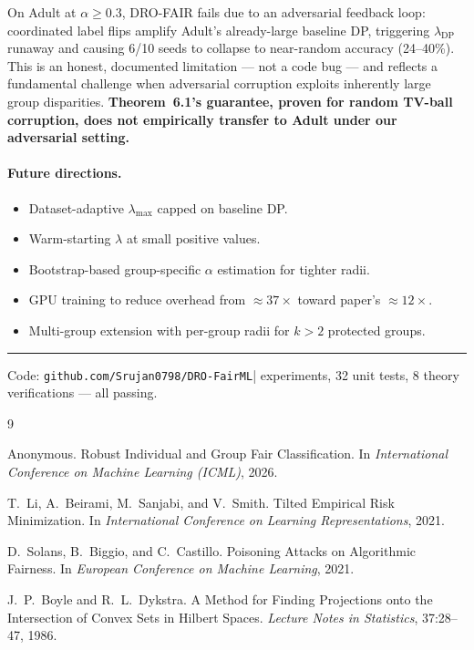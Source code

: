 \documentclass[11pt,a4paper]{article}
\newcommand{\lDP}{\lambda_{\mathrm{DP}}}
\begin{document}
On Adult at $\alpha\ge 0.3$, DRO-FAIR fails due to an adversarial feedback
loop: coordinated label flips amplify Adult's already-large baseline DP,
triggering $\lDP$ runaway and causing 6/10 seeds to collapse to near-random
accuracy (24--40\%).  This is an honest, documented limitation --- not a code
bug --- and reflects a fundamental challenge when adversarial corruption
exploits inherently large group disparities.
\textbf{Theorem~6.1's guarantee, proven for random TV-ball corruption, does
not empirically transfer to Adult under our adversarial setting.}

\paragraph{Future directions.}
\begin{itemize}
\item Dataset-adaptive $\lambda_{\max}$ capped on baseline DP.
\item Warm-starting $\lambda$ at small positive values.
\item Bootstrap-based group-specific $\alpha$ estimation for tighter radii.
\item GPU training to reduce overhead from $\approx37\times$ toward
  paper's $\approx12\times$.
\item Multi-group extension with per-group radii for $k>2$ protected groups.
\end{itemize}

\vspace{1em}
\hrule
\vspace{0.5em}
{\small
Code: \texttt{github.com/Srujan0798/DRO-FairML}\quad| experiments, 32 unit tests, 8 theory verifications --- all passing.
}


\begin{thebibliography}{9}

Anonymous.
\newblock Robust Individual and Group Fair Classification.
\newblock In \emph{International Conference on Machine Learning (ICML)}, 2026.

T.~Li, A.~Beirami, M.~Sanjabi, and V.~Smith.
\newblock Tilted Empirical Risk Minimization.
\newblock In \emph{International Conference on Learning Representations}, 2021.

D.~Solans, B.~Biggio, and C.~Castillo.
\newblock Poisoning Attacks on Algorithmic Fairness.
\newblock In \emph{European Conference on Machine Learning}, 2021.

J.~P.~Boyle and R.~L.~Dykstra.
\newblock A Method for Finding Projections onto the Intersection of Convex Sets
  in Hilbert Spaces.
\newblock \emph{Lecture Notes in Statistics}, 37:28--47, 1986.

\end{thebibliography}
\end{document}
